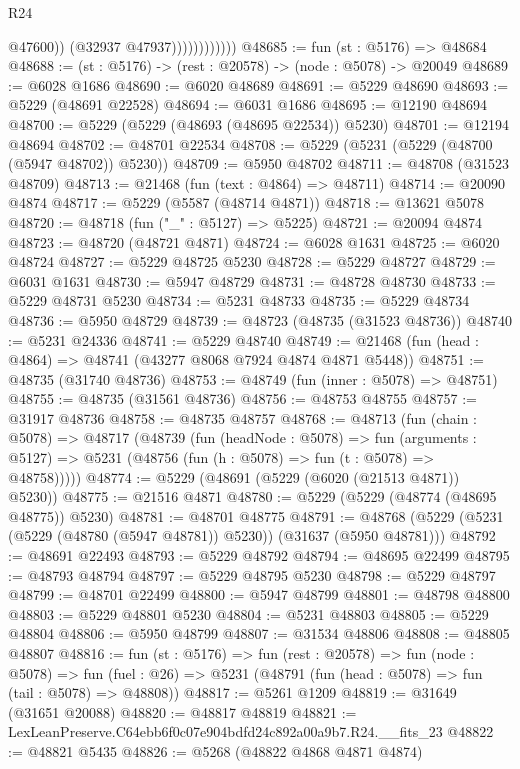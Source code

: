 \begin{lexlean}{R24}
\begin{coremodule}
                              @47600))
                          (@32937 @47937))))))))))))
@48685 := fun (st : @5176) => @48684
@48688 := (st : @5176) -> (rest : @20578) -> (node : @5078) -> @20049
@48689 := @6028 @1686
@48690 := @6020 @48689
@48691 := @5229 @48690
@48693 := @5229 (@48691 @22528)
@48694 := @6031 @1686
@48695 := @12190 @48694
@48700 := @5229 (@5229 (@48693 (@48695 @22534)) @5230)
@48701 := @12194 @48694
@48702 := @48701 @22534
@48708 := @5229 (@5231 (@5229 (@48700 (@5947 @48702)) @5230))
@48709 := @5950 @48702
@48711 := @48708 (@31523 @48709)
@48713 := @21468 (fun (text : @4864) => @48711)
@48714 := @20090 @4874
@48717 := @5229 (@5587 (@48714 @4871))
@48718 := @13621 @5078
@48720 := @48718 (fun ("_" : @5127) => @5225)
@48721 := @20094 @4874
@48723 := @48720 (@48721 @4871)
@48724 := @6028 @1631
@48725 := @6020 @48724
@48727 := @5229 @48725 @5230
@48728 := @5229 @48727
@48729 := @6031 @1631
@48730 := @5947 @48729
@48731 := @48728 @48730
@48733 := @5229 @48731 @5230
@48734 := @5231 @48733
@48735 := @5229 @48734
@48736 := @5950 @48729
@48739 := @48723 (@48735 (@31523 @48736))
@48740 := @5231 @24336
@48741 := @5229 @48740
@48749 := @21468 (fun (head : @4864) => @48741 (@43277 @8068 @7924 @4874 @4871 @5448))
@48751 := @48735 (@31740 @48736)
@48753 := @48749 (fun (inner : @5078) => @48751)
@48755 := @48735 (@31561 @48736)
@48756 := @48753 @48755
@48757 := @31917 @48736
@48758 := @48735 @48757
@48768 := @48713
    (fun (chain : @5078) =>
    @48717
      (@48739
        (fun (headNode : @5078) =>
        fun (arguments : @5127) => @5231 (@48756 (fun (h : @5078) => fun (t : @5078) => @48758)))))
@48774 := @5229 (@48691 (@5229 (@6020 (@21513 @4871)) @5230))
@48775 := @21516 @4871
@48780 := @5229 (@5229 (@48774 (@48695 @48775)) @5230)
@48781 := @48701 @48775
@48791 := @48768 (@5229 (@5231 (@5229 (@48780 (@5947 @48781)) @5230)) (@31637 (@5950 @48781)))
@48792 := @48691 @22493
@48793 := @5229 @48792
@48794 := @48695 @22499
@48795 := @48793 @48794
@48797 := @5229 @48795 @5230
@48798 := @5229 @48797
@48799 := @48701 @22499
@48800 := @5947 @48799
@48801 := @48798 @48800
@48803 := @5229 @48801 @5230
@48804 := @5231 @48803
@48805 := @5229 @48804
@48806 := @5950 @48799
@48807 := @31534 @48806
@48808 := @48805 @48807
@48816 := fun (st : @5176) =>
  fun (rest : @20578) =>
  fun (node : @5078) =>
  fun (fuel : @26) => @5231 (@48791 (fun (head : @5078) => fun (tail : @5078) => @48808))
@48817 := @5261 @1209
@48819 := @31649 (@31651 @20088)
@48820 := @48817 @48819
@48821 := LexLeanPreserve.C64ebb6f0c07e904bdfd24c892a00a9b7.R24.__fits_23
@48822 := @48821 @5435
@48826 := @5268 (@48822 @4868 @4871 @4874)

\end{coremodule}
\end{lexlean}
